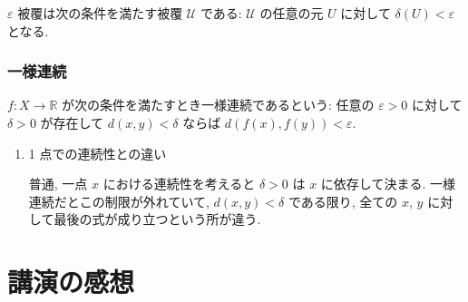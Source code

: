 \documentclass[openany, a4paper, oneside]{jsbook}
\begin{document}
$\varepsilon$ 被覆は次の条件を満たす被覆 $\mathcal{U}$ である:
$\mathcal{U}$ の任意の元 $U$ に対して $\delta (U) < \varepsilon$ となる.
\subsubsection{一様連続}

$f \colon X \to \mathbb{R}$ が次の条件を満たすとき一様連続であるという:
任意の $\varepsilon > 0$ に対して $\delta > 0$ が存在して $d (x, y) < \delta$ ならば $d (f (x), f (y)) < \varepsilon$.
\begin{enumerate}
\item 1 点での連続性との違い

普通, 一点 $x$ における連続性を考えると $\delta > 0$ は $x$ に依存して決まる.
一様連続だとこの制限が外れていて, $d (x, y) < \delta$ である限り, 全ての $x$, $y$ に対して最後の式が成り立つという所が違う.
\end{enumerate}
\section{講演の感想}
\end{document}
